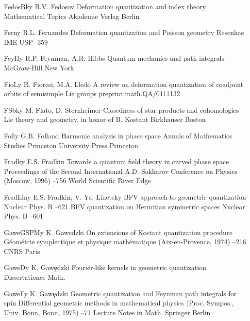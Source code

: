 \documentclass[12pt]{amsart}
\numberwithin{equation}{section}
\theoremstyle{remark}
\newcommand{\by}{\mathbf y}
\begin{document}
\begin{thebibliography}{199}
 FedosBk\by{ B.V. Fedosov \book Deformation quantization and index theory
\bookinfo Mathematical Topics  \publ Akademie Verlag \publaddr Berlin }

 Fern\by{ R.L. Fernandes \paper Deformation quantization and Poisson
geometry \jour Resenhas IME-USP   -359}

 FeyH\by{ R.P. Feynman, A.R. Hibbs \book Quantum mechanics and path
integrals \publ McGraw-Hill \publaddr New York }

 FioL\by{ R. Fioresi, M.A. Lledo \paper A review on deformation
quantization of coadjoint orbits of semisimple Lie groups \paperinfo
preprint math.QA/0111132}

 FSbk\by{ M. Flato, D. Sternheimer \paper Closedness of star products and
cohomologies \inbook Lie theory and geometry, in honor of B. Kostant  \publ Birkhauser \publaddr
Boston }

 Foll\by{ G.B. Folland \book Harmonic analysis in phase space \bookinfo
Annals of Mathematics Studies  \publ Princeton University Press
\publaddr Princeton }

 Fradk\by{ E.S. Fradkin \paper Towards a quantum field theory in curved
phase space \inbook Proceedings of the Second International A.D. Sakharov
Conference on Physics (Moscow, 1996) --756 \publ World Scientific
\publaddr River Edge }

 FradLin\by{ E.S. Fradkin, V. Ya. Linetsky \paper BFV approach to
geometric quantization \jour Nuclear Phys. B   --621
\moreref \paper BFV quantization on Hermitian symmetric spaces \jour Nuclear
Phys. B   --601}

 GaweGSPM\by{ K. Gawedzki \paper On extensions of Kostant quantization
procedure \inbook G\'eom\'etrie symplectique et physique math\'ematique
(Aix-en-Provence, 1974) --216 \publ CNRS \publaddr Paris }

 GaweD\by{ K. Gaw\c{e}dzki \paper Fourier-like kernels in geometric
quantization \jour Dissertationes Math.  }

 GaweF\by{ K. Gaw\c{e}dzki \paper Geometric quantization and Feynman path
integrals for spin \inbook Differential geometric methods in mathematical
physics (Proc. Sympos., Univ. Bonn, Bonn, 1975) --71 \bookinfo Lecture
Notes in Math.  \publ Springer \publaddr Berlin }


\end{thebibliography}
\end{document}
